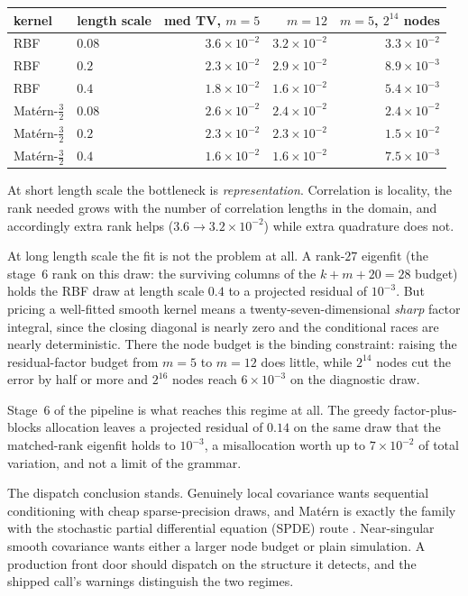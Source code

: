 \documentclass[11pt]{article}
\begin{document}
\begin{center}\small
\begin{tabular}{llrrr}
\toprule
kernel & length scale & med TV, $m{=}5$ & $m{=}12$ & $m{=}5$, $2^{14}$ nodes\\
\midrule
RBF & $0.08$ & $3.6\times10^{-2}$ & $3.2\times10^{-2}$ & $3.3\times10^{-2}$\\
RBF & $0.2$  & $2.3\times10^{-2}$ & $2.9\times10^{-2}$ & $8.9\times10^{-3}$\\
RBF & $0.4$  & $1.8\times10^{-2}$ & $1.6\times10^{-2}$ & $5.4\times10^{-3}$\\
Mat\'ern-$\tfrac32$ & $0.08$ & $2.6\times10^{-2}$ & $2.4\times10^{-2}$ & $2.4\times10^{-2}$\\
Mat\'ern-$\tfrac32$ & $0.2$  & $2.3\times10^{-2}$ & $2.3\times10^{-2}$ & $1.5\times10^{-2}$\\
Mat\'ern-$\tfrac32$ & $0.4$  & $1.6\times10^{-2}$ & $1.6\times10^{-2}$ & $7.5\times10^{-3}$\\
\bottomrule
\end{tabular}
\end{center}

At short length scale the bottleneck is \emph{representation}.
Correlation is locality, the rank needed grows with the number of
correlation lengths in the domain, and accordingly extra rank helps
($3.6\to3.2\times10^{-2}$) while extra quadrature does not.

At long length scale the fit is not the problem at all. A rank-$27$
eigenfit (the stage~6 rank on this draw: the surviving columns of the
$k+m+20=28$ budget) holds the RBF draw at length scale $0.4$ to a projected residual
of $10^{-3}$. But pricing a well-fitted smooth kernel means a
twenty-seven-dimensional \emph{sharp} factor integral, since the closing
diagonal is nearly zero and the conditional races are nearly
deterministic. There the node budget is the binding constraint:
raising the residual-factor budget from $m=5$ to $m=12$ does little,
while $2^{14}$ nodes cut the error by half or more
and $2^{16}$ nodes reach $6\times10^{-3}$ on the diagnostic draw.

Stage~6 of the pipeline is what reaches this regime at all. The greedy
factor-plus-blocks allocation leaves a projected residual of $0.14$ on
the same draw that the matched-rank eigenfit holds to $10^{-3}$, a
misallocation worth up to $7\times10^{-2}$ of total variation, and not a
limit of the grammar.

The dispatch conclusion stands. Genuinely local covariance wants
sequential conditioning with cheap sparse-precision draws, and Mat\'ern
is exactly the family with the stochastic partial differential equation (SPDE) route \citep{lindgren2011}.
Near-singular smooth covariance wants either a larger node budget or
plain simulation. A production front door should dispatch on the
structure it detects, and the shipped call's warnings distinguish the two
regimes.
\end{document}
